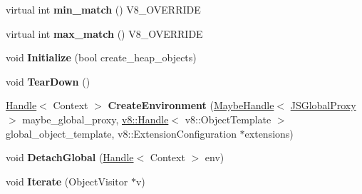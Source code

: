 \begin{DoxyCompactItemize}
\item 
\hypertarget{classv8_1_1internal_1_1_v8___f_i_n_a_l_ac4abdb29d336dc24ef96695ac805b1ac}{}virtual int {\bfseries min\+\_\+match} () V8\+\_\+\+O\+V\+E\+R\+R\+I\+D\+E\label{classv8_1_1internal_1_1_v8___f_i_n_a_l_ac4abdb29d336dc24ef96695ac805b1ac}

\item 
\hypertarget{classv8_1_1internal_1_1_v8___f_i_n_a_l_a0b9dd74bfd4f1172c26a072c44da8669}{}virtual int {\bfseries max\+\_\+match} () V8\+\_\+\+O\+V\+E\+R\+R\+I\+D\+E\label{classv8_1_1internal_1_1_v8___f_i_n_a_l_a0b9dd74bfd4f1172c26a072c44da8669}

\item 
\hypertarget{classv8_1_1internal_1_1_v8___f_i_n_a_l_aa185e40b3a7b475c4e99432e466d8abe}{}void {\bfseries Initialize} (bool create\+\_\+heap\+\_\+objects)\label{classv8_1_1internal_1_1_v8___f_i_n_a_l_aa185e40b3a7b475c4e99432e466d8abe}

\item 
\hypertarget{classv8_1_1internal_1_1_v8___f_i_n_a_l_a00230226274cbb3b8d3f9f0c9d6c75e3}{}void {\bfseries Tear\+Down} ()\label{classv8_1_1internal_1_1_v8___f_i_n_a_l_a00230226274cbb3b8d3f9f0c9d6c75e3}

\item 
\hypertarget{classv8_1_1internal_1_1_v8___f_i_n_a_l_abe824976d98ddaba6fd219178b787ef8}{}\hyperlink{classv8_1_1internal_1_1_handle}{Handle}$<$ Context $>$ {\bfseries Create\+Environment} (\hyperlink{classv8_1_1internal_1_1_maybe_handle}{Maybe\+Handle}$<$ \hyperlink{classv8_1_1internal_1_1_j_s_global_proxy}{J\+S\+Global\+Proxy} $>$ maybe\+\_\+global\+\_\+proxy, \hyperlink{classv8_1_1_handle}{v8\+::\+Handle}$<$ v8\+::\+Object\+Template $>$ global\+\_\+object\+\_\+template, v8\+::\+Extension\+Configuration $\ast$extensions)\label{classv8_1_1internal_1_1_v8___f_i_n_a_l_abe824976d98ddaba6fd219178b787ef8}

\item 
\hypertarget{classv8_1_1internal_1_1_v8___f_i_n_a_l_ae98746109d455ed2461027b42690b274}{}void {\bfseries Detach\+Global} (\hyperlink{classv8_1_1internal_1_1_handle}{Handle}$<$ Context $>$ env)\label{classv8_1_1internal_1_1_v8___f_i_n_a_l_ae98746109d455ed2461027b42690b274}

\item 
\hypertarget{classv8_1_1internal_1_1_v8___f_i_n_a_l_a8d3963889aa11a8246c69bd9241daf05}{}void {\bfseries Iterate} (Object\+Visitor $\ast$v)\label{classv8_1_1internal_1_1_v8___f_i_n_a_l_a8d3963889aa11a8246c69bd9241daf05}


\end{DoxyCompactItemize}
